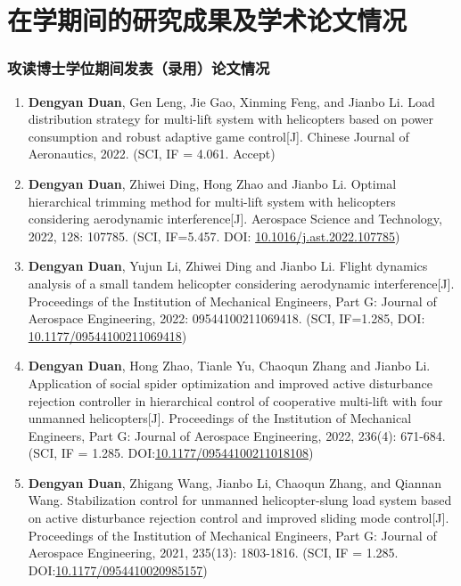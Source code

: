 \chapter{在学期间的研究成果及学术论文情况}


\subsection*{攻读博士学位期间发表（录用）论文情况}

\begin{enumerate}
  \item \textbf{Dengyan Duan}, Gen Leng, Jie Gao, Xinming Feng, and Jianbo Li. Load distribution strategy for multi-lift system with helicopters based on power consumption and robust adaptive game control[J]. Chinese Journal of Aeronautics, 2022. (SCI, IF = 4.061. Accept)
  \item \textbf{Dengyan Duan}, Zhiwei Ding, Hong Zhao and Jianbo Li. Optimal hierarchical trimming method for multi-lift system with helicopters considering aerodynamic interference[J]. Aerospace Science and Technology, 2022, 128: 107785. (SCI, IF=5.457. DOI: \href{https://doi.org/10.1016/j.ast.2022.107785}{10.1016/j.ast.2022.107785})
  \item \textbf{Dengyan Duan}, Yujun Li, Zhiwei Ding and Jianbo Li. Flight dynamics analysis of a small tandem helicopter considering aerodynamic interference[J]. Proceedings of the Institution of Mechanical Engineers, Part G: Journal of Aerospace Engineering, 2022: 09544100211069418. (SCI, IF=1.285, DOI: \href{https://doi.org/10.1177/09544100211069418}{10.1177/09544100211069418})
  \item \textbf{Dengyan Duan}, Hong Zhao, Tianle Yu, Chaoqun Zhang and Jianbo Li. Application of social spider optimization and improved active disturbance rejection controller in hierarchical control of cooperative multi-lift with four unmanned helicopters[J]. Proceedings of the Institution of Mechanical Engineers, Part G: Journal of Aerospace Engineering, 2022, 236(4): 671-684. (SCI, IF = 1.285. DOI:\href{https://doi.org/10.1177/09544100211018108}{10.1177/09544100211018108})
  \item \textbf{Dengyan Duan}, Zhigang Wang, Jianbo Li, Chaoqun Zhang, and Qiannan Wang. Stabilization control for unmanned helicopter-slung load system based on active disturbance rejection control and improved sliding mode control[J]. Proceedings of the Institution of Mechanical Engineers, Part G: Journal of Aerospace Engineering, 2021, 235(13): 1803-1816. (SCI, IF = 1.285. DOI:\href{https://doi.org/10.1177/0954410020985157}{10.1177/0954410020985157})

\end{enumerate}
